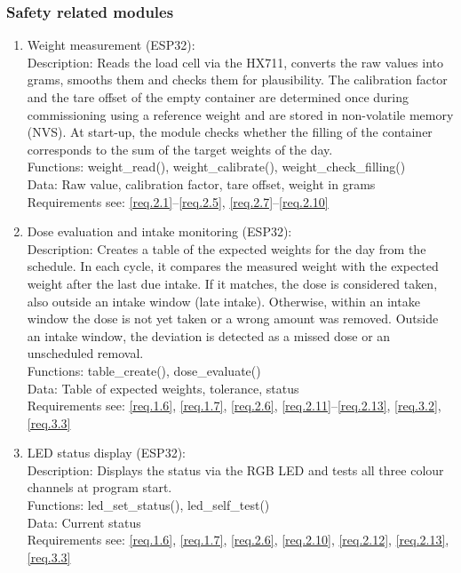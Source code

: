 \subsubsection{Safety related modules}
	\begin{enumerate}
		\item Weight measurement (ESP32): \\
			Description: Reads the load cell via the HX711, converts the raw
			values into grams, smooths them and checks them for plausibility.
			The calibration factor and the tare offset of the empty container
			are determined once during commissioning using a reference weight
			and are stored in non-volatile memory (NVS). At start-up, the
			module checks whether the filling of the container corresponds to
			the sum of the target weights of the day. \\
			Functions: weight\_read(), weight\_calibrate(),
			weight\_check\_filling() \\
			Data: Raw value, calibration factor, tare offset, weight in grams \\
			Requirements see: \ref{req.2.1}--\ref{req.2.5}, \ref{req.2.7}--\ref{req.2.10}

		\item Dose evaluation and intake monitoring (ESP32): \\
			Description: Creates a table of the expected weights for the day
			from the schedule. In each cycle, it compares the measured weight
			with the expected weight after the last due intake. If it matches,
			the dose is considered taken, also outside an intake window (late
			intake). Otherwise, within an intake window the dose is not yet
			taken or a wrong amount was removed. Outside an intake window, the
			deviation is detected as a missed dose or an unscheduled removal. \\
			Functions: table\_create(), dose\_evaluate() \\
			Data: Table of expected weights, tolerance, status \\
			Requirements see: \ref{req.1.6}, \ref{req.1.7}, \ref{req.2.6}, \ref{req.2.11}--\ref{req.2.13}, \ref{req.3.2}, \ref{req.3.3}

		\item LED status display (ESP32): \\
			Description: Displays the status via the RGB LED and tests all
			three colour channels at program start. \\
			Functions: led\_set\_status(), led\_self\_test() \\
			Data: Current status \\
			Requirements see: \ref{req.1.6}, \ref{req.1.7}, \ref{req.2.6}, \ref{req.2.10}, \ref{req.2.12}, \ref{req.2.13}, \ref{req.3.3}


\end{enumerate}
